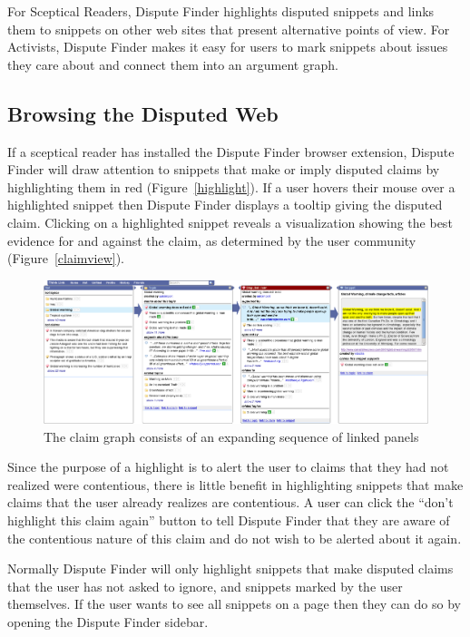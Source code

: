 \documentclass{www2010-submission}
\begin{document}
For Sceptical Readers, Dispute Finder highlights disputed snippets and links them to snippets on other web sites that present alternative points of view. For Activists, Dispute Finder makes it easy for users to mark snippets about issues they care about and connect them into an argument graph.

\subsection{Browsing the Disputed Web}

If a sceptical reader has installed the Dispute Finder browser extension, Dispute Finder will draw attention to snippets that make or imply disputed claims by highlighting them in red (Figure~\ref{highlight}). If a user hovers their mouse over a highlighted snippet then Dispute Finder displays a tooltip giving the disputed claim. Clicking on a highlighted snippet reveals a visualization showing the best evidence for and against the claim, as determined by the user community (Figure~\ref{claimview}).

\begin{figure}[tb]
	\begin{center}
	\includegraphics[width=18cm]{../screenshots/v2_panels2.png}
	\caption{The claim graph consists of an expanding sequence of linked panels}
	\label{panels}
	\end{center}
\end{figure}

Since the purpose of a highlight is to alert the user to claims that they had not realized were contentious, there is little benefit in highlighting snippets that make claims that the user already realizes are contentious. A user can click the ``don't highlight this claim again'' button to tell Dispute Finder that they are aware of the contentious nature of this claim and do not wish to be alerted about it again.

Normally Dispute Finder will only highlight snippets that make disputed claims that the user has not asked to ignore, and snippets marked by the user themselves. If the user wants to see all snippets on a page then they can do so by opening the Dispute Finder sidebar. 
\end{document}
